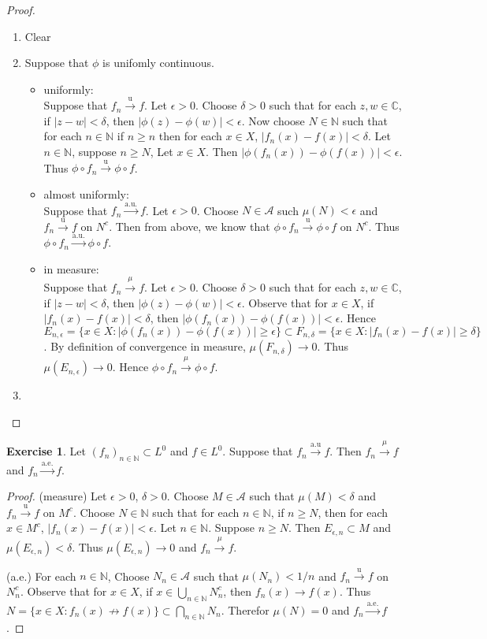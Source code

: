 \documentclass[12pt]{amsart}
\theoremstyle{definition}
\newtheorem{ex}[definition]{Exercise}
\newcommand{\del}{\delta}
\newcommand{\ep}{\epsilon}
\newcommand{\C}{\mathbb{C}}
\newcommand{\N}{\mathbb{N}}
\newcommand{\MA}{\mathcal{A}}
\newcommand{\convt}[1]{\xrightarrow{\text{#1}}}
\newcommand{\conv}[1]{\xrightarrow{#1}}
\newcommand{\lex}[1]{\label{ex:#1}}
\begin{document}
	\begin{proof}\
		\begin{enumerate}
			\item Clear
			\item Suppose that $\phi$ is unifomly continuous. 
			\begin{itemize}
				\item uniformly: \\
				Suppose that $f_n \convt{u} f$. Let $\ep > 0$. Choose $\del >0$ such that for each $z,w \in \C$, if $|z-w|<\del$, then $|\phi(z) - \phi(w)| < \ep$. Now choose $N \in \N$ such that for each $n \in \N$ if $n \geq n$ then for each $x \in X$, $|f_n(x)-f(x)| < \del$. Let $n \in \N$, suppose $n \geq N$, Let $x \in X$. Then $|\phi(f_n(x)) - \phi(f(x))| < \ep$. Thus $\phi \circ f_n \convt{u} \phi \circ f$. 
				\item almost uniformly: \\
				Suppose that $f_n \convt{a.u.} f$. Let $\ep > 0$. Choose $N \in \MA$ such $\mu(N) < \ep$ and $f_n \convt{u} f$ on $N^c$. Then from above, we know that $\phi \circ f_n \convt{u} \phi \circ f$ on $N^c$. Thus $\phi \circ f_n \convt{a.u.} \phi \circ f$.
				\item in measure:\\ Suppose that $f_n \conv{\mu} f$. Let $\ep > 0$. Choose $\del >0$ such that for each $z,w \in \C$, if $|z-w|<\del$, then $|\phi(z) - \phi(w)| < \ep$. Observe that for $x \in X$, if $|f_n(x) - f(x)| < \del$, then $|\phi(f_n(x)) - \phi(f(x))| < \ep$. Hence $E_{n,\ep} = \{x \in X: |\phi(f_n(x)) - \phi(f(x))| \geq \ep\} \subset F_{n,\del} = \{x \in X: |f_n(x) - f(x)| \geq \del\}$. By definition of convergence in measure, $\mu(F_{n,\del}) \rightarrow 0$. Thus $\mu(E_{n,\ep}) \rightarrow 0$. Hence $\phi \circ f_n \conv{\mu} \phi \circ f$.
			\end{itemize}
			\item
		\end{enumerate}
	\end{proof}
	
	\begin{ex} \lex{35011} 
		Let $(f_n)_{n \in \N} \subset L^0$ and $f \in L^0$. Suppose that $f_n \convt{a.u} f$. Then $f_n \conv{\mu}f$ and $f_n \convt{a.e.}f$. 
	\end{ex}
	
	\begin{proof}
		(measure) Let $\ep>0$, $\del >0$. Choose $M \in \MA$ such that $\mu(M) < \del$ and $f_n \convt{u} f$ on $M^c$. Choose $N \in \N$ such that for each $n \in \N$, if $n \geq N$, then for each $x \in M^c$, $|f_n(x) - f(x)| < \ep$. Let $n \in \N$. Suppose $n \geq N$. Then $E_{\ep,n} \subset M$ and $\mu(E_{\ep,n}) < \del$. Thus $\mu(E_{\ep,n}) \rightarrow 0$ and $f_n \conv{\mu} f$.
		
		(a.e.) For each $n \in \N$, Choose $N_n \in \MA$ such that $\mu(N_n) < 1/n$ and $f_n \convt{u} f$ on $N_n^c$. Observe that for $x \in X$, if $x \in \bigcup_{n \in \N}N_n^c$, then $f_n(x) \rightarrow f(x)$. Thus $N = \{x \in X: f_n(x) \not \rightarrow f(x)\} \subset \bigcap_{n \in \N} N_n$. Therefor $\mu(N) = 0$ and $f_n \convt{a.e.} f$.
	\end{proof}
	
\end{document}
